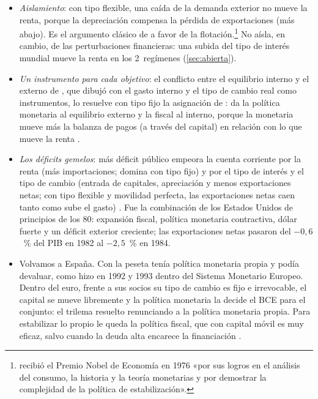 \documentclass[11pt]{article}
\begin{document}
\begin{infografia}[!htb]
\centering
\caption{El trilema de la política monetaria en una economía abierta}\label{figu:trilema}
\end{infografia}

\begin{itemize}
\item \emph{Aislamiento}: con tipo flexible, una caída de la demanda exterior no mueve la renta, porque la depreciación compensa la pérdida de exportaciones (más abajo). Es el argumento clásico de \textcite{Friedman1953Case} a favor de la flotación.\footnote{ recibió el Premio Nobel de Economía en 1976 «por sus logros en el análisis del consumo, la historia y la teoría monetarias y por demostrar la complejidad de la política de estabilización»\nocite{Nobel1976Friedman}.} No aísla, en cambio, de las perturbaciones financieras: una subida del tipo de interés mundial mueve la renta en los 2~regímenes (\ref{sec:abierta}).
\item \emph{Un instrumento para cada objetivo}: el conflicto entre el equilibrio interno y el externo de \textcite{Meade1951}, que \textcite{Swan1963Longer} dibujó con el gasto interno y el tipo de cambio real como instrumentos, lo resuelve con tipo fijo la asignación de \textcite{Mundell1962Appropriate}: da la política monetaria al equilibrio externo y la fiscal al interno, porque la monetaria mueve más la balanza de pagos (a través del capital) en relación con lo que mueve la renta .
\item \emph{Los déficits gemelos}: más déficit público empeora la cuenta corriente por la renta (más importaciones; domina con tipo fijo) y por el tipo de interés y el tipo de cambio (entrada de capitales, apreciación y menos exportaciones netas; con tipo flexible y movilidad perfecta, las exportaciones netas caen tanto como sube el gasto) . Fue la combinación de los Estados Unidos de principios de los 80: expansión fiscal, política monetaria contractiva, dólar fuerte y un déficit exterior creciente; las exportaciones netas pasaron del $-0{,}6$~\% del PIB en 1982 al $-2{,}5$~\% en 1984\nocite{FRED2026ExportacionesNetas}.
\item Volvamos a España. Con la peseta tenía política monetaria propia y podía devaluar, como hizo en 1992 y 1993 dentro del Sistema Monetario Europeo. Dentro del euro, frente a sus socios su tipo de cambio es fijo e irrevocable, el capital se mueve libremente y la política monetaria la decide el BCE para el conjunto: el trilema resuelto renunciando a la política monetaria propia. Para estabilizar lo propio le queda la política fiscal, que con capital móvil es muy eficaz, salvo cuando la deuda alta encarece la financiación  .
\end{itemize}
\end{document}
